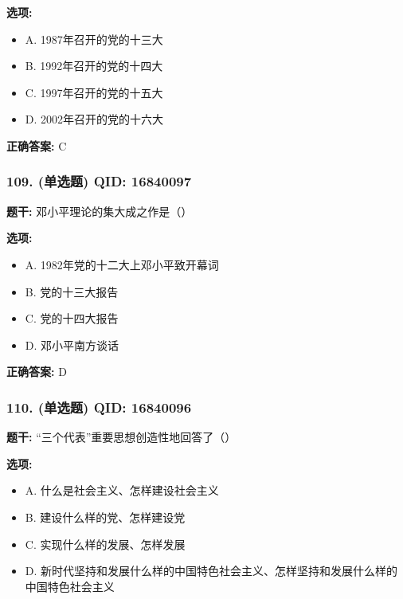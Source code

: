 \documentclass[12pt,UTF8]{ctexart}
\begin{document}
\textbf{选项:}
\begin{itemize}[leftmargin=*]

  \item A. 1987年召开的党的十三大

  \item B. 1992年召开的党的十四大

  \item C. 1997年召开的党的十五大

  \item D. 2002年召开的党的十六大

\end{itemize}

\textbf{正确答案:}
C

\vspace{0.3em}\hrulefill\vspace{0.7em}

\subsubsection*{109. (单选题) \small QID: 16840097}

\textbf{题干:}
邓小平理论的集大成之作是（）

\textbf{选项:}
\begin{itemize}[leftmargin=*]

  \item A. 1982年党的十二大上邓小平致开幕词

  \item B. 党的十三大报告

  \item C. 党的十四大报告

  \item D. 邓小平南方谈话

\end{itemize}

\textbf{正确答案:}
D

\vspace{0.3em}\hrulefill\vspace{0.7em}

\subsubsection*{110. (单选题) \small QID: 16840096}

\textbf{题干:}
“三个代表”重要思想创造性地回答了（）

\textbf{选项:}
\begin{itemize}[leftmargin=*]

  \item A. 什么是社会主义、怎样建设社会主义

  \item B. 建设什么样的党、怎样建设党

  \item C. 实现什么样的发展、怎样发展

  \item D. 新时代坚持和发展什么样的中国特色社会主义、怎样坚持和发展什么样的中国特色社会主义

\end{itemize}
\end{document}
